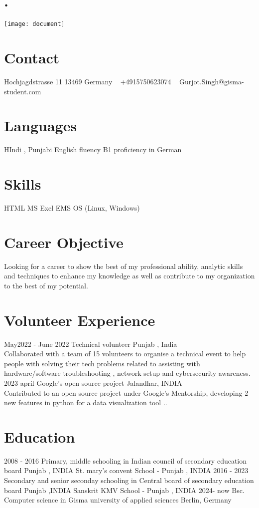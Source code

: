 \documentclass[]{cv-style} %
\begin{document}
\begin{aside}
\section{.}
\texttt{[image: document]}
\section{Contact}
Hochjagdstrasse 11
13469
Germany
~
+4915750623074
~
Gurjot.Singh@gisma-student.com
\section{Languages}
HIndi , Punjabi
English fluency
B1 proficiency in German
\section{Skills}
HTML
MS Exel
EMS 
OS (Linux, Windows)
\end{aside}
\section{Career Objective}
  \vspace{-0.2cm}
Looking for a career to show the best of my professional ability, analytic skills and techniques to enhance my knowledge as well as contribute to my organization to the best of my potential.
\section{Volunteer Experience}
\begin{entrylist}
\entry
  {May2022 - June 2022}
   {Technical volunteer}
  {Punjab , India}
  {\\
Collaborated with a team of 15 volunteers to organise a technical event to help people with solving their tech problems related to assisting with hardware/software troubleshooting , network setup and cybersecurity awareness.\\}
\entry
  {2023 april}
  {Google's open source project}
  {Jalandhar, INDIA}
  {\\
Contributed   \jobtitle to an open source project under Google's Mentorship, developing 2 new features in python for a data visualization tool ..\\}
\end{entrylist}
\section{Education}
\begin{entrylist}
\entry
{2008 - 2016}
{Primary, middle schooling {\normalfont in Indian council of secondary education board }}
{Punjab , INDIA}
{St. mary's convent School - Punjab , INDIA}
\entry
{2016 - 2023}
{Secondary and senior seconday schooling  {\normalfont in Central board of secondary education board }}
{ Punjab ,INDIA}
{Sanskrit KMV School - Punjab , INDIA}
\entry
{2024- now} {Bsc. Computer science {\normalfont in Gisma university of applied sciences}}
{Berlin, Germany}


\end{entrylist} 
\end{document}
